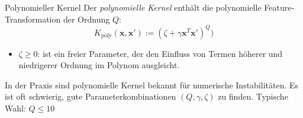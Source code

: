 \begin{defi}{Polynomieller Kernel}
    Der \emph{polynomielle Kernel} enthält die polynomielle Feature-Transformation der Ordnung $Q$:
    \[
        K_\text{poly}(\mathbf{x}, \mathbf{x}') := (\zeta + \gamma \mathbf{x}^T \mathbf{x}')^Q)
    \]
    \begin{itemize}
        \item $\zeta \geq 0$: ist ein freier Parameter, der den Einfluss von Termen höherer und niedrigerer Ordnung im Polynom ausgleicht.
    \end{itemize}

    In der Praxis sind polynomielle Kernel bekannt für numerische Instabilitäten. Es ist oft schwierig, gute Parameterkombinationen $(Q, \gamma, \zeta)$ zu finden.
    Typische Wahl: $Q \leq 10$
\end{defi}

